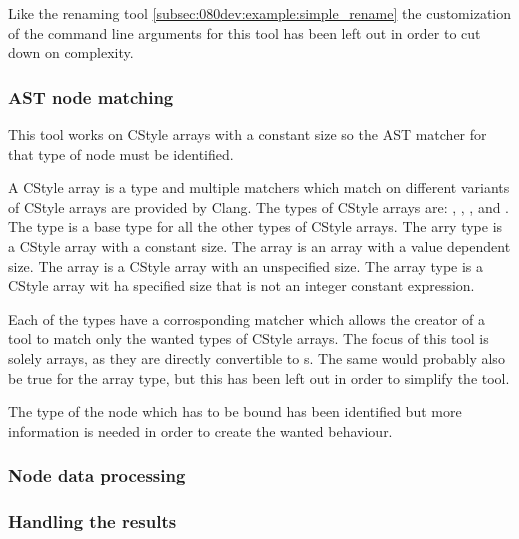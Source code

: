 Like the renaming tool \cref{subsec:080dev:example:simple_rename} the customization of the command line arguments for this tool has been left out in order to cut down on complexity.

\subsubsection*{AST node matching}

This tool works on CStyle arrays with a constant size so the AST matcher for that type of node must be identified.

A CStyle array is a type and multiple matchers which match on different variants of CStyle arrays are provided by Clang. The types of CStyle arrays are: , , ,  and . \\
The  type is a base type for all the other types of CStyle arrays. The  arry type is a CStyle array with a constant size. The  array is an array with a value dependent size. The  array is a CStyle array with an unspecified size. The  array type is a CStyle array wit ha specified size that is not an integer constant expression.

Each of the types have a corrosponding matcher which allows the creator of a tool to match only the wanted types of CStyle arrays. The focus of this tool is solely  arrays, as they are directly convertible to s. The same would probably also be true for the  array type, but this has been left out in order to simplify the tool.

The type of the node which has to be bound has been identified but more information is needed in order to create the wanted behaviour. 






\subsubsection*{Node data processing}



\subsubsection*{Handling the results}

